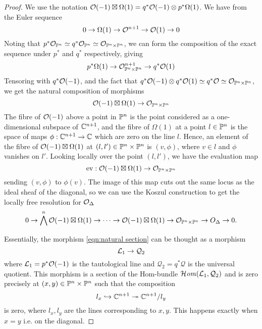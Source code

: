 \begin{proof}
    We use the notation $\O(-1)\boxtimes\Omega(1)=q^*\O(-1)\otimes p^*\Omega(1)$. We have from \cite{Hartshorne} the Euler sequence
    \begin{equation*}
        0 \to \Omega(1) \to \O^{n+1} \to \O(1) \to 0
    \end{equation*}
    Noting that $p^*\O_{\P^n}\simeq q^*\O_{\P^n}\simeq\O_{\P^n\times\P^n}$, we can form the composition of the exact sequence under $p^*$ and $q^*$ respectively, giving
    \begin{equation*}
        p^*\Omega(1) \to \O_{\P^n\times\P^n}^{n+1}\to q^*\O(1)
    \end{equation*}
    Tensoring with $q^*\O(-1)$, and the fact that $q^*\O(-1)\otimes q^*\O(1)\simeq q^*\O\simeq\O_{\P^n\times\P^n}$, we get the natural composition of morphisms
    \begin{equation}\label{eqn:natural section}
        \O(-1)\boxtimes\Omega(1) \to \O_{\P^n\times\P^n}
    \end{equation}
    The fibre of $\O(-1)$ above a point in $\P^n$ is the point considered as a one-dimensional subspace of $\C^{n+1}$, and the fibre of $\Omega(1)$ at a point $l \in \P^n$ is the space of maps $\phi : \C^{n+1}\to \C$ which are zero on the line $l$. Hence, an element of the fibre of  $\O(-1)\boxtimes \Omega (1)$ at $(l,l') \in \P^{n}\times \P^n$ is $(v,\phi)$, where $v \in l$ and $\phi$ vanishes on $l'$. Looking locally over the point $(l,l')$, we have the evaluation map
    \begin{equation*}
        \ev : \O(-1)\boxtimes \Omega (1) \to \O_{\P^{n}\times \P^{n}}
    \end{equation*}
    sending $(v,\phi)$ to $\phi(v)$. The image of this map cuts out the same locus as the ideal sheaf of the diagonal, so we can use the Koszul construction to get the locally free resolution for $\O_\Delta$
    \begin{equation*}
        0 \to \bigwedge^{n}\O(-1)\boxtimes\Omega(1) \to \dots\to \O(-1)\boxtimes\Omega(1)\to \O_{\P^{n}\times \P^{n}} \to O_{\Delta}\to 0.
    \end{equation*}

    Essentially, the morphism \ref{eqn:natural section} can be thought as a morphism $$\calL_1 \rightarrow \mathcal{Q}_2$$where $\calL_1=p^*\O(-1)$ is the tautological line and $\mathcal{Q}_2=q^*\mathcal{Q}$ is the universal quotient. This morphism is a section of the Hom-bundle $\lHom(\calL_1, \mathcal{Q}_2)$ and is zero precisely at $(x,y)\in \P^{n}\times \P^n$ such that the composition $$l_x \hookrightarrow \C^{n+1}\twoheadrightarrow \C^{n+1}/l_y$$
    is zero, where $l_x, l_y$ are the lines corresponding to $x,y$. This happens exactly when $x=y$ i.e. on the diagonal.



\end{proof}

